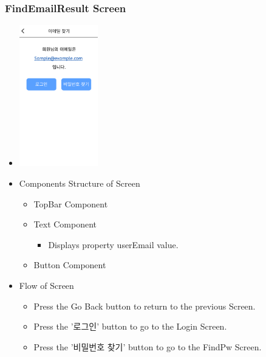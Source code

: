 \documentclass[conference]{IEEEtran}
\begin{document}
\subsubsection{FindEmailResult Screen}
\begin{itemize}
    \item[] \includegraphics[width=0.27\textwidth]{img/D/6.png}
    \item Components Structure of Screen
    \begin{itemize}
        \item TopBar Component
        \item Text Component
        \begin{itemize}
            \item Displays property userEmail value.
        \end{itemize}
        \item Button Component
    \end{itemize}
    \item Flow of Screen
    \begin{itemize}
        \item Press the Go Back button to return to the previous Screen.
        \item Press the '로그인' button to go to the Login Screen.
        \item Press the '비밀번호 찾기’ button to go to the FindPw Screen.
        \\
    \end{itemize}
\end{itemize}
\newpage
\end{document}
